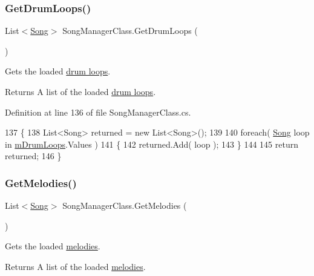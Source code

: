 \subsubsection{\texorpdfstring{Get\+Drum\+Loops()}{GetDrumLoops()}}
{\footnotesize\ttfamily List$<$\hyperlink{class_song}{Song}$>$ Song\+Manager\+Class.\+Get\+Drum\+Loops (\begin{DoxyParamCaption}{ }\end{DoxyParamCaption})}



Gets the loaded \hyperlink{group___song_group_DocSongDrumLoop}{drum loops}. 

\begin{DoxyReturn}{Returns}
A list of the loaded \hyperlink{group___song_group_DocSongDrumLoop}{drum loops}. 
\end{DoxyReturn}


Definition at line 136 of file Song\+Manager\+Class.\+cs.


\begin{DoxyCode}
137     \{
138         List<Song> returned = \textcolor{keyword}{new} List<Song>();
139 
140         \textcolor{keywordflow}{foreach}( \hyperlink{class_song}{Song} loop \textcolor{keywordflow}{in} \hyperlink{group___s_m_priv_var_ga84f25335035755448d11acb9287360f2}{mDrumLoops}.Values )
141         \{
142             returned.Add( loop );
143         \}
144 
145         \textcolor{keywordflow}{return} returned;
146     \}
\end{DoxyCode}
\mbox{\label{group___s_m_pub_func_ga7d46ab1949725dd7c3c00ac3975916fe}} 
\subsubsection{\texorpdfstring{Get\+Melodies()}{GetMelodies()}}
{\footnotesize\ttfamily List$<$\hyperlink{class_song}{Song}$>$ Song\+Manager\+Class.\+Get\+Melodies (\begin{DoxyParamCaption}{ }\end{DoxyParamCaption})}



Gets the loaded \hyperlink{group___song_group_DocSongMelody}{melodies}. 

\begin{DoxyReturn}{Returns}
A list of the loaded \hyperlink{group___song_group_DocSongMelody}{melodies}. 
\end{DoxyReturn}


